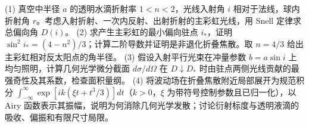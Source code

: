 (1) 真空中半径 \(a\) 的透明水滴折射率 \(1<n<2\)，光线入射角 \(i\) 相对于法线，球内折射角 \(r\)。考虑入射折射、一次内反射、出射折射的主彩虹光线，用 Snell 定律求总偏向角 \(D(i)\)。
(2) 求产生主彩虹的最小偏向驻点 \(i_*\)，证明 \(\sin^2i_*=(4-n^2)/3\)；计算二阶导数并证明是非退化折叠焦散。取 \(n=4/3\) 给出主彩虹相对反太阳点的角半径。
(3) 假设入射平行光束在冲量参数 \(b=a\sin i\) 上均匀照明，计算几何光学微分截面 \(d\sigma/d\Omega\) 在 \(D\downarrow D_*\) 时由驻点两侧光线贡献的最强奇性及其系数，检查面积量纲。
(4) 将波动场在折叠焦散附近局部展开为规范积分 \(\int_{-\infty}^{\infty}\exp[ik(\xi t+t^3/3)]dt\)（\(k>0\)，\(\xi\) 为带符号控制参数且已归一化），以 Airy 函数表示其振幅，说明为何消除几何光学发散；讨论衍射标度与透明液滴的吸收、偏振和有限尺寸局限。

